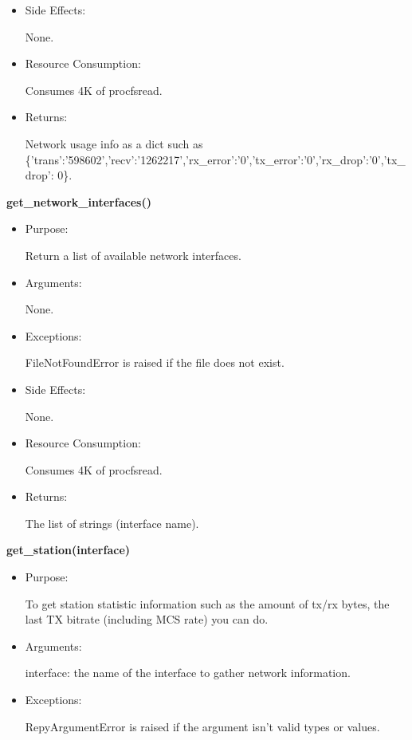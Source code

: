{\begin{itemize}
\item Side Effects:

None.

\item Resource Consumption:

Consumes 4K of procfsread.

\item Returns:

Network usage info as a dict such as \{'trans':'598602','recv':'1262217','rx\_error':'0','tx\_error':'0','rx\_drop':'0','tx\_drop': 0\}.
\end{itemize}

\textbf{get\_network\_interfaces()}
\begin{itemize}
\item Purpose:

Return a list of available network interfaces.

\item Arguments:

None.

\item Exceptions:

FileNotFoundError is raised if the file does not exist.

\item Side Effects:

None.

\item Resource Consumption:

Consumes 4K of procfsread.

\item Returns:

The list of strings (interface name).

\end{itemize}

\textbf{get\_station(interface)}
\begin{itemize}
\item Purpose:

To get station statistic information such as the amount of tx/rx bytes, the last TX bitrate (including MCS rate) you can do.

\item Arguments:

interface: the name of the interface to gather network information.

\item Exceptions:

RepyArgumentError is raised if the argument isn't valid types or values.


\end{itemize}}
